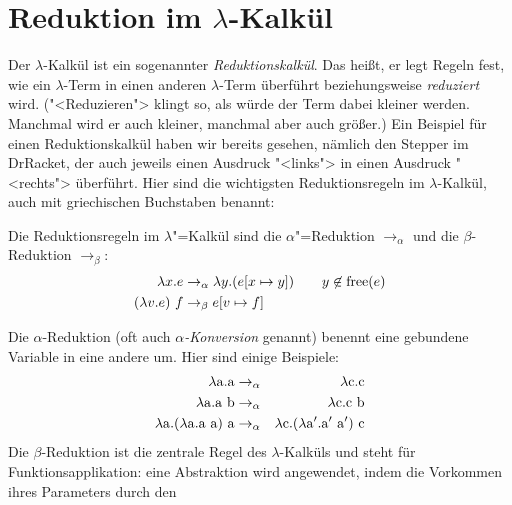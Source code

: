 \section{Reduktion im $\lambda$-Kalkül}

Der $\lambda$-Kalkül ist ein sogenannter
\textit{Reduktionskalkül}. Das heißt, er legt
Regeln fest, wie ein $\lambda$-Term in einen anderen $\lambda$-Term
überführt beziehungsweise \textit{reduziert} wird.  ("<Reduzieren">
klingt so, als würde der Term dabei kleiner werden.  Manchmal wird er
auch kleiner, manchmal aber auch größer.)  Ein Beispiel für einen
Reduktionskalkül haben wir bereits gesehen, nämlich den Stepper im
DrRacket, der auch jeweils einen Ausdruck "<links"> in einen Ausdruck
"<rechts"> überführt.  Hier sind die wichtigsten Reduktionsregeln im
$\lambda$-Kalkül, auch mit griechischen Buchstaben benannt:
%
\begin{definition}[Reduktionsregeln]
  Die Reduktionsregeln im $\lambda$"=Kalkül sind
  die $\alpha$"=Reduktion $\rightarrow_{\alpha}$ und die
  $\beta$-Reduktion $\rightarrow_{\beta}$:%
  \begin{alignat*}{2}
    \lambda x.e & \rightarrow_{\alpha} \lambda y.(e[x\mapsto y]) \quad 
    & y\not\in\operatorname{free}(e)
    \\
    (\lambda v.e)~f & \rightarrow_{\beta} e[v\mapsto f]
  \end{alignat*}
\end{definition}
%
Die $\alpha$-Reduktion (oft auch \textit{$\alpha$-Konversion} genannt)
benennt eine gebundene Variable in eine andere um.  Hier sind einige
Beispiele:
%
\begin{eqnarray*}
  \lambda \mathrm a.\mathrm a & \rightarrow_{\alpha} & \lambda \mathrm c.\mathrm c\\
  \lambda \mathrm a.\mathrm a~\mathrm b & \rightarrow_{\alpha} & \lambda \mathrm c.\mathrm c~\mathrm b\\
  \lambda \mathrm a.(\lambda \mathrm a.\mathrm a~\mathrm a)~\mathrm a & \rightarrow_{\alpha} & 
  \lambda \mathrm c.(\lambda \mathrm a'.\mathrm a'~\mathrm a')~\mathrm c
\end{eqnarray*}
%
Die $\beta$-Reduktion ist die zentrale Regel des $\lambda$-Kalküls und steht für
Funktionsapplikation: eine Abstraktion
wird angewendet, indem die Vorkommen ihres Parameters durch den
